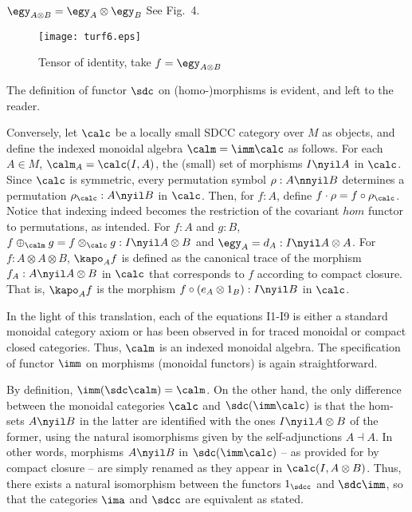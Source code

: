 \documentclass{eptcs}
\begin{document}
   $\egy _{A\otimes B}=\egy _A\otimes \egy _B$
\vspp\newline
See Fig.\ 4.
\begin{figure}
\begin{center}
\texttt{[image: turf6.eps]}
\end{center}
\vspmini
\caption{Tensor of identity, take $f=\egy _{A\otimes B}$}
\vspmini 
\end{figure}
\vspe
The definition of functor $\sdc $ on (homo-)morphisms is evident, and left to the reader.

Conversely, let $\calc $ be a locally small SDCC category over $M$ as objects, and define the indexed
monoidal algebra $\calm =\imm \calc $ as follows. For each $A\in M$, $\calm _A=
\calc (I,A)$, the (small) set of morphisms $I\nyil A$ in $\calc $. Since $\calc $
is symmetric, every permutation symbol $\rho :A\nnyil B$ determines a permutation
$\rho _{\calc }:A\nyil B$ in $\calc $. Then, for $f:A$,
define $f\cdot \rho =f\circ \rho _{\calc }$. Notice that indexing
indeed becomes the restriction of the covariant $hom$ functor to permutations, as intended.
For $f:A$ and $g:B$, $f\oplus _{\calm} g=f\otimes _{\calc} g: I\nyil A\otimes B$ and
$\egy _A=d_A:I\nyil A\otimes A$. For $f:A\otimes A\otimes B$, $\kapo _A f$ is 
defined as the canonical trace of the morphism $f _A:A\nyil A\otimes B$ in
$\calc $ that corresponds to $f$ according to compact closure. That is,
$\kapo _A f$ is the morphism $f\circ (e _A\otimes 1_B):I\nyil B$ in
$\calc $.

In the light of this translation, each of
the equations I1-I9 is either a standard monoidal category axiom or has been observed
in \cite{tra,cc} for traced monoidal or compact closed categories.
Thus, $\calm $ is an indexed monoidal algebra. The specification of
functor $\imm $ on morphisms (monoidal functors) is again straightforward.

By definition, $\imm (\sdc \calm )=\calm$. On the other hand, the only difference
between the monoidal categories $\calc $ and $\sdc (\imm \calc )$ is that the hom-sets 
$A\nyil B$ in the latter are identified with the ones $I\nyil A\otimes B$ of the former,
using the natural isomorphisms given by the self-adjunctions $A\dashv A$. 
In other words, morphisms $A\nyil B$ in $\sdc (\imm \calc )$ -- as provided for by compact
closure -- are simply renamed as they appear in $\calc (I,A\otimes B)$. Thus,
there exists a natural isomorphism between the functors $1_{\sdcc }$ and $\sdc \imm $,
so that the categories $\ima $ and $\sdcc $ are equivalent as stated. 
\vege 
\end{document}
